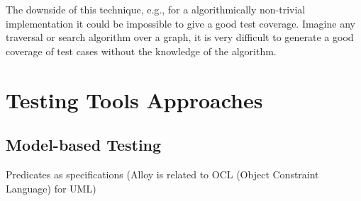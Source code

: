 \documentclass[citeauthoryear]{llncs}
\begin{document}
The downside of this technique, e.g., for a algorithmically non-trivial implementation it could be impossible to give a good test coverage.
Imagine any traversal or search algorithm over a graph, it is very difficult to generate a good coverage of test cases without the knowledge of the algorithm.

\section{Testing Tools Approaches}

\subsection{Model-based Testing}
Predicates as specifications (Alloy is related to OCL (Object Constraint Language) for UML)


\end{document}
